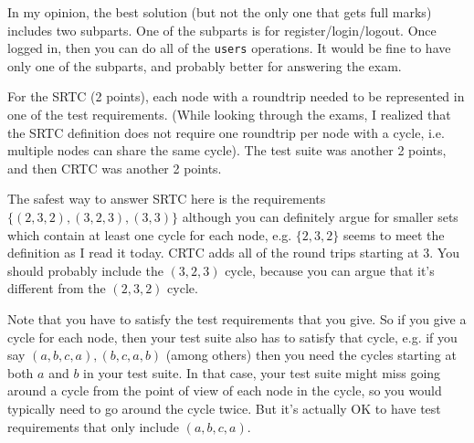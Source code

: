 \documentclass[11pt,onecolumn,letterpaper]{article}
\begin{document}
In my opinion, the best solution (but not the only one that gets full marks)
includes two subparts. One of the subparts is for register/login/logout.
Once logged in, then you can do all of the {\tt users} operations. It would
be fine to have only one of the subparts, and probably better for answering the exam.

\begin{center}
\end{center}


For the SRTC (2 points), each
node with a roundtrip needed to be represented in one of the test
requirements.  (While looking through the exams, I realized that the
SRTC definition does not require one roundtrip per node with a cycle,
i.e. multiple nodes can share the same cycle).  The test suite was
another 2 points, and then CRTC was another 2 points.

The safest way to answer SRTC here is the requirements $\{(2, 3, 2), (3, 2, 3), (3, 3)\}$
although you can definitely argue for smaller sets which contain at least
one cycle for each node, e.g. $\{2, 3, 2\}$ seems to meet the definition as I read
it today. CRTC adds all of the round trips starting at $3$. You should probably include
the $(3, 2, 3)$ cycle, because you can argue that it's different from the $(2,3,2)$ cycle.

Note that you have to satisfy the test requirements that you give. So
if you give a cycle for each node, then your test suite also has to
satisfy that cycle, e.g. if you say $(a, b, c, a), (b, c, a, b)$
(among others) then you need the cycles starting at both $a$ and $b$
in your test suite.  In that case, your test suite might miss going
around a cycle from the point of view of each node in the cycle, so
you would typically need to go around the cycle twice. But it's
actually OK to have test requirements that only include $(a, b, c,
a)$.
\end{document}
